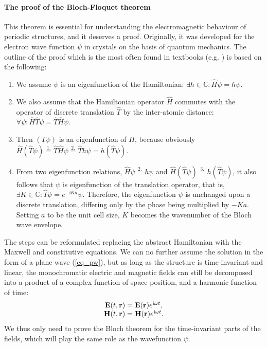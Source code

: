 \paragraph{The proof of the Bloch-Floquet theorem}%
This theorem is essential for understanding the electromagnetic behaviour of periodic structures, and it deserves a proof. Originally, it was developed for the electron wave function $\psi$ in crystals on the basis of quantum mechanics. The outline of the proof which is the most often found in textbooks (e.g. \cite[p. 134]{ashcroft2005solid}) is based on the following:
\begin{enumerate}
 \item{We assume $\psi$ is an eigenfunction of the Hamiltonian: $\exists h\in \mathbb{C}: \hat H\psi = h\psi$.} 
 \item{We also assume that the Hamiltonian operator $\hat H$ commutes with the operator of discrete translation $\hat T$ by the inter-atomic distance: $\forall \psi: \hat H\hat T\psi = \hat T\hat H\psi$. } 
 \item{Then $(T\psi)$ is an eigenfunction of $H$, because obviously $\hat H(\hat T\psi) \stackrel{1.}{=} \hat T\hat H\psi \stackrel{2.}{=} \hat Th\psi = h(\hat T\psi)$.}
 \item{From two eigenfunction relations, $\hat H\psi\stackrel{2.}{=} h\psi$ and $\hat H(\hat T\psi) \stackrel{3.}{=} h(\hat T\psi)$, it also follows that $\psi$ is eigenfunction of the translation operator, that is,
$\exists K\in \mathbb{C}: \hat T\psi = e^{-\ii Ka}\psi$.  Therefore, the eigenfunction $\psi$ is unchanged upon a discrete translation, differing only by the phase being multiplied by $-Ka$. Setting $a$ to be the unit cell size, $K$ becomes the wavenumber of the Bloch wave envelope.
}
 \end{enumerate}
The steps can be reformulated replacing the abstract Hamiltonian with the Maxwell and constitutive equations. We can no further assume the solution in the form of a plane wave (\ref{eq_pw}), but as long as the structure is time-invariant and linear, the monochromatic electric and magnetic fields can still be decomposed into a product of a complex function of space position, and a harmonic function of time:
\begin{equation} 
\begin{array}{cc}
\mathbf{E}(t, {\mathbf{r}}) = \mathbf{E}({\mathbf{r}}) e^{{\mathrm i} \omega t}, \\
\mathbf{H}(t, {\mathbf{r}}) = \mathbf{H}({\mathbf{r}}) e^{{\mathrm i} \omega t}. 
\end{array}
\label{eq_harmonic}\end{equation}
We thus only need to prove the Bloch theorem for the time-invariant parts of the fields, which will play the same role as the wavefunction $\psi$.

